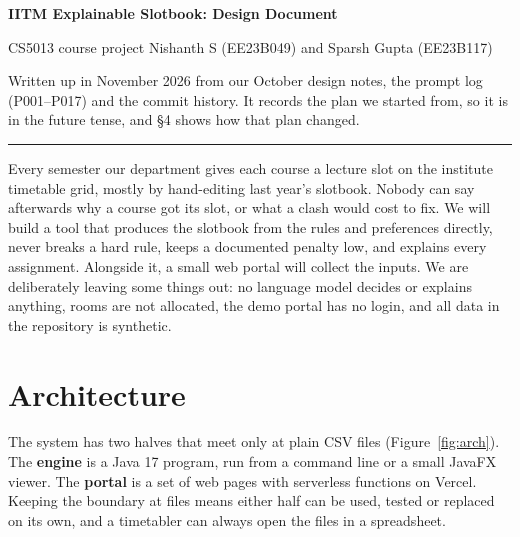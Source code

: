 \documentclass[10pt,a4paper]{article}
\begin{document}
{\sffamily
{\LARGE\bfseries\color{ink} IITM Explainable Slotbook: Design Document\par}
\vspace{3pt}
{\normalsize CS5013 course project \quad\textbullet\quad Nishanth S (EE23B049) and Sparsh Gupta (EE23B117)\par}
}
\vspace{-1pt}
{\footnotesize\color{black!60} Written up in November 2026 from our October design notes, the prompt log (P001--P017) and the commit history. It records the plan we started from, so it is in the future tense, and \S4 shows how that plan changed.\par}
\vspace{2pt}
\rule{\linewidth}{0.5pt}

Every semester our department gives each course a lecture slot on the institute timetable grid, mostly by hand-editing last year's slotbook. Nobody can say afterwards why a course got its slot, or what a clash would cost to fix. We will build a tool that produces the slotbook from the rules and preferences directly, never breaks a hard rule, keeps a documented penalty low, and explains every assignment. Alongside it, a small web portal will collect the inputs. We are deliberately leaving some things out: no language model decides or explains anything, rooms are not allocated, the demo portal has no login, and all data in the repository is synthetic.

\section{Architecture}

The system has two halves that meet only at plain CSV files (Figure~\ref{fig:arch}). The \textbf{engine} is a Java 17 program, run from a command line or a small JavaFX viewer. The \textbf{portal} is a set of web pages with serverless functions on Vercel. Keeping the boundary at files means either half can be used, tested or replaced on its own, and a timetabler can always open the files in a spreadsheet.
\end{document}
